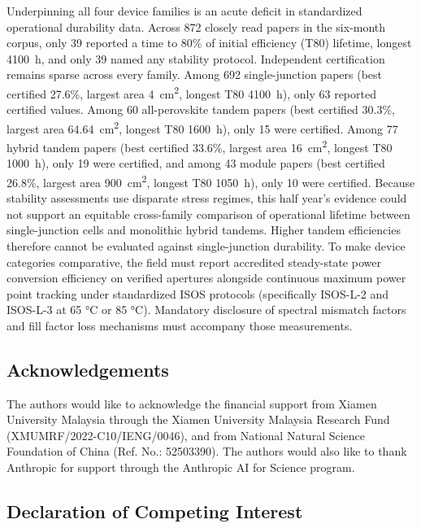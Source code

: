 \documentclass[
  11pt,
]{article}
\begin{document}
Underpinning all four device families is an acute deficit in
standardized operational durability data. Across 872 closely read papers
in the six-month corpus, only 39 reported a time to 80\% of initial
efficiency (T80) lifetime, longest \qty{4100}{\hour}, and only 39 named
any stability protocol. Independent certification remains sparse across
every family. Among 692 single-junction papers (best certified 27.6\%,
largest area \qty{4}{\centi\meter\squared}, longest T80
\qty{4100}{\hour}), only 63 reported certified values. Among 60
all-perovskite tandem papers (best certified 30.3\%, largest area
\qty{64.64}{\centi\meter\squared}, longest T80 \qty{1600}{\hour}), only
15 were certified. Among 77 hybrid tandem papers (best certified 33.6\%,
largest area \qty{16}{\centi\meter\squared}, longest T80
\qty{1000}{\hour}), only 19 were certified, and among 43 module papers
(best certified 26.8\%, largest area \qty{900}{\centi\meter\squared},
longest T80 \qty{1050}{\hour}), only 10 were certified. Because
stability assessments use disparate stress regimes, this half year's
evidence could not support an equitable cross-family comparison of
operational lifetime between single-junction cells and monolithic hybrid
tandems. Higher tandem efficiencies therefore cannot be evaluated
against single-junction durability. To make device categories
comparative, the field must report accredited steady-state power
conversion efficiency on verified apertures alongside continuous maximum
power point tracking under standardized ISOS protocols (specifically
ISOS-L-2 and ISOS-L-3 at 65 °C or 85 °C). Mandatory disclosure of
spectral mismatch factors and fill factor loss mechanisms must accompany
those measurements.

\subsection{Acknowledgements}\label{acknowledgements}

The authors would like to acknowledge the financial support from Xiamen
University Malaysia through the Xiamen University Malaysia Research Fund
(XMUMRF/2022-C10/IENG/0046), and from National Natural Science
Foundation of China (Ref. No.: 52503390). The authors would also like to
thank Anthropic for support through the Anthropic AI for Science
program.

\subsection{Declaration of Competing
Interest}\label{declaration-of-competing-interest}
\end{document}
